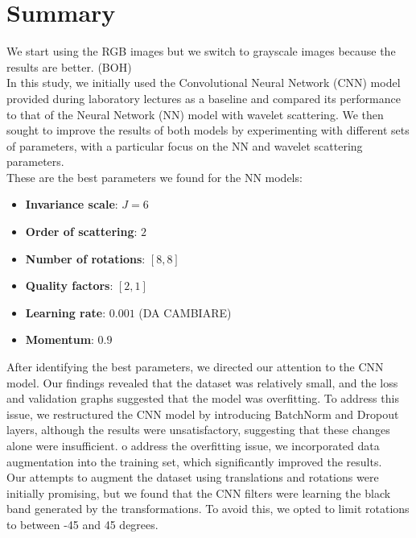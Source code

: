 \documentclass{report}
\begin{document}
\section{Summary}
We start using the RGB images but we switch to grayscale images because the results are better. (BOH)\\
In this study, we initially used the Convolutional Neural Network (CNN) model provided during laboratory 
lectures as a baseline and compared its performance to that of the Neural Network (NN) model with wavelet scattering.
We then sought to improve the results of both models by experimenting with different sets of parameters, with a particular 
focus on the NN and wavelet scattering parameters. \\
These are the best parameters we found for the NN models:
\begin{itemize}
    \item \textbf{Invariance scale}: $J=6$
    \item \textbf{Order of scattering}: $2$
    \item \textbf{Number of rotations}: $[8, 8]$
    \item \textbf{Quality factors}: $[2, 1]$
    \item \textbf{Learning rate}: $0.001$ (DA CAMBIARE)
    \item \textbf{Momentum}: $0.9$
\end{itemize}
After identifying the best parameters, we directed our attention to the CNN model.
Our findings revealed that the dataset was relatively small, and the loss and validation 
graphs suggested that the model was overfitting. To address this issue, we restructured the 
CNN model by introducing BatchNorm and Dropout layers, although 
the results were unsatisfactory, suggesting that these changes alone were insufficient.
o address the overfitting issue, we incorporated data augmentation into the training set, 
which significantly improved the results. \\
Our attempts to augment the dataset using translations and rotations were initially promising, 
but we found that the CNN filters were learning the black band generated by the transformations. 
To avoid this, we opted to limit rotations to between -45 and 45 degrees.\\
\end{document}

